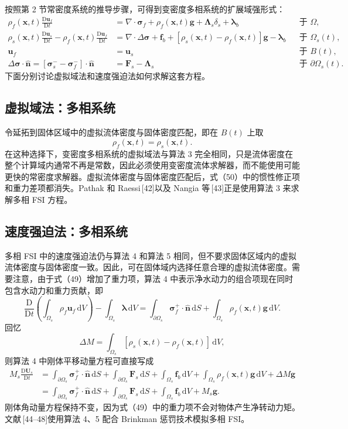 \documentclass[UTF8,11pt,a4paper]{ctexart}
\newcommand{\dd}{\,\mathrm{d}}
\newcommand{\D}{\mathrm{D}}
\begin{document}
按照第 2 节常密度系统的推导步骤，可得到变密度多相系统的扩展域强形式：
\begin{align}
\rho_f(\bm x,t)\frac{\D\bm u_f}{\D t}
&=\nabla\cdot\bm\sigma_f+\rho_f(\bm x,t)\bm g+\bm\Lambda_s\delta_s+\bm\lambda_b &&\text{于 }\Omega, \tag{49}\\
\rho_s(\bm x,t)\frac{\D\bm u_s}{\D t}
-\rho_f(\bm x,t)\frac{\D\bm u_f}{\D t}
&=\nabla\cdot\Delta\bm\sigma+\bm f_b+[\rho_s(\bm x,t)-\rho_f(\bm x,t)]\bm g-\bm\lambda_b &&\text{于 }\Omega_s(t), \tag{50}\\
\bm u_f&=\bm u_s &&\text{于 }B(t), \tag{51}\\
\Delta\bm\sigma\cdot\hat{\bm n}
=\left[\bm\sigma_s^{-}-\bm\sigma_f^{-}\right]\cdot\hat{\bm n}
&=\bm F_s-\bm\Lambda_s &&\text{于 }\partial\Omega_s(t). \tag{52}
\end{align}
下面分别讨论虚拟域法和速度强迫法如何求解这套方程。

\subsection{虚拟域法：多相系统}

令延拓到固体区域中的虚拟流体密度与固体密度匹配，即在 $B(t)$ 上取
\[
\rho_f(\bm x,t)=\rho_s(\bm x,t).
\]
在这种选择下，变密度多相系统的虚拟域法与算法 3 完全相同，只是流体密度在整个计算域内通常不再是常数，因此必须使用变密度流体求解器，而不能使用可能更快的常密度求解器。虚拟流体密度与固体密度匹配后，式（50）中的惯性修正项和重力差项都消失。Pathak 和 Raessi\,[42]以及 Nangia 等\,[43]正是使用算法 3 来求解多相 FSI 方程。

\subsection{速度强迫法：多相系统}

多相 FSI 中的速度强迫法仍与算法 4 和算法 5 相同，但不要求固体区域内的虚拟流体密度与固体密度一致。因此，可在固体域内选择任意合理的虚拟流体密度。需要注意，由于式（49）增加了重力项，算法 4 中表示净水动力的组合项现在同时包含水动力和重力贡献，即
\begin{equation}
\frac{\D}{\D t}\left(\int_{\Omega_s}\rho_f\bm u_f\dd V\right)
-\int_{\Omega_s}\bm\lambda\dd V
=\int_{\partial\Omega_s}\bm\sigma_f^{+}\cdot\hat{\bm n}\dd S
+\int_{\Omega_s}\rho_f(\bm x,t)\bm g\dd V. \tag{53}
\end{equation}
回忆
\[
\Delta M=\int_{\Omega_s}[\rho_s(\bm x,t)-\rho_f(\bm x,t)]\dd V,
\]
则算法 4 中刚体平移动量方程可直接写成
\begin{align}
M_s\frac{\D\bm U_s}{\D t}
&=\int_{\partial\Omega_s}\bm\sigma_f^{+}\cdot\hat{\bm n}\dd S
+\int_{\partial\Omega_s}\bm F_s\dd S
+\int_{\Omega_s}\bm f_b\dd V
+\int_{\Omega_s}\rho_f(\bm x,t)\bm g\dd V+\Delta M\bm g \nonumber\\
&=\int_{\partial\Omega_s}\bm\sigma_f^{+}\cdot\hat{\bm n}\dd S
+\int_{\partial\Omega_s}\bm F_s\dd S
+\int_{\Omega_s}\bm f_b\dd V+M_s\bm g. \tag{54}
\end{align}
刚体角动量方程保持不变，因为式（49）中的重力项不会对物体产生净转动力矩。文献\,[44--48]使用算法 4、5 配合 Brinkman 惩罚技术模拟多相 FSI。
\end{document}
